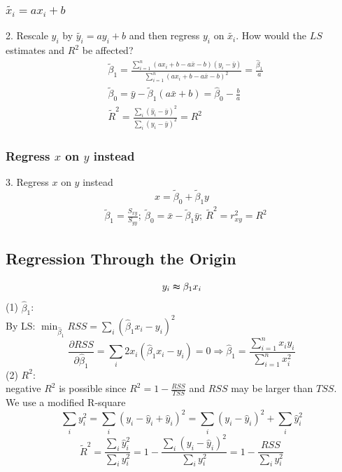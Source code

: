 \documentclass[11pt,a4paper]{article}
\begin{document}
\subsubsection{$\tilde{x_i}=ax_i+b$}
2. Rescale $y_i$ by $\tilde{y_i}=ay_i+b$ and then regress $y_i$ on $\tilde{x_i}$. How would the $LS$ estimates and $R^2$ be affected?
\begin{equation}
    \begin{aligned}
        &\tilde{\beta}_1=\frac{\sum_{i=1}^{n}\left(ax_{i}+b-a\bar{x}-b\right)\left(y_{i}-\bar{y}\right)}{\sum_{i=1}^{n}\left(ax_{i}+b-a\bar{x}-b\right)^{2}}=\frac{\hat{\beta}_1}{a}\\
        &\tilde{\beta}_0=\bar{y}-\tilde{\beta}_{1}(a\bar{x}+b)=\hat{\beta}_0-\frac{b}{a}\\
        &\tilde{R}^2=\frac{\sum_{i}\left(\hat{y}_{i}-\bar{y}\right)^{2}}{\sum_{i}\left(y_{i}-\bar{y}\right)^{2}}=R^2
    \end{aligned}
    \nonumber
\end{equation}
\subsubsection{Regress $x$ on $y$ instead}
3. Regress $x$ on $y$ instead
$$x=\tilde{\beta}_0+\tilde{\beta}_1y$$
\begin{equation}
    \begin{aligned}
        &\tilde{\beta}_1=\frac{S_{x y}}{S_{yy}};\ \tilde{\beta}_0=\bar{x}-\tilde{\beta}_1\bar{y};\ \tilde{R}^2=r_{xy}^2=R^2
    \end{aligned}
    \nonumber
\end{equation}

\subsection{Regression Through the Origin}
$$y_i\thickapprox \beta_1 x_i$$
(1) $\hat{\beta}_1$:\\
By LS: $\min_{\hat{\beta}_1} RSS=\sum_i(\hat{\beta}_1x_i-y_i)^2$
$$\frac{\partial RSS}{\partial \hat{\beta}_1}=\sum_i2x_i(\hat{\beta}_1x_i-y_i)=0 \Rightarrow \hat{\beta}_1=\frac{\sum_{i=1}^{n}x_{i}y_{i}}{\sum_{i=1}^{n}x_{i}^{2}}$$
(2) $R^2$:\\
negative $R^2$ is possible since $R^2=1-\frac{RSS}{TSS}$ and $RSS$ may be larger than $TSS$.\\
We use a modified R-square\\
$$\sum_iy_i^2=\sum_i(y_i-\hat{y}_i+\hat{y}_i)^2=\sum_i(y_i-\hat{y}_i)^2+\sum_i \hat{y}_i^2$$
$$\tilde{R}^2=\frac{\sum_i \hat{y}_i^2}{\sum_iy_i^2}=1-\frac{\sum_i(y_i-\hat{y}_i)^2}{\sum_iy_i^2}=1-\frac{RSS}{\sum_iy_i^2}$$
\end{document}
